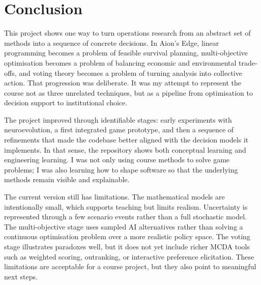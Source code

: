 \section{Conclusion}

This project shows one way to turn operations research from an abstract
set of methods into a sequence of concrete decisions. In Aion's Edge,
linear programming becomes a problem of feasible survival planning,
multi-objective optimisation becomes a problem of balancing economic and
environmental trade-offs, and voting theory becomes a problem of turning
analysis into collective action. That progression was deliberate. It was
my attempt to represent the course not as three unrelated techniques,
but as a pipeline from optimisation to decision support to institutional
choice.

The project improved through identifiable stages: early
experiments with neuroevolution, a first integrated game prototype, and
then a sequence of refinements that made the codebase better aligned
with the decision models it implements. In that sense, the repository
shows both conceptual learning and engineering learning. I was not only
using course methods to solve game problems; I was also learning how to
shape software so that the underlying methods remain visible and
explainable.

The current version still has limitations. The mathematical models are
intentionally small, which supports teaching but limits realism.
Uncertainty is represented through a few scenario events rather than a
full stochastic model. The multi-objective stage uses sampled AI
alternatives rather than solving a continuous optimisation problem over a
more realistic policy space. The voting stage illustrates paradoxes well,
but it does not yet include richer MCDA tools such as weighted scoring,
outranking, or interactive preference elicitation. These limitations are
acceptable for a course project, but they also point to meaningful next
steps.